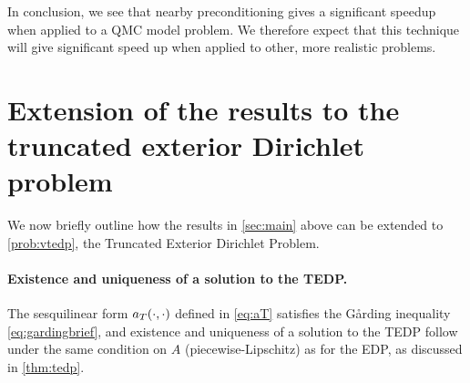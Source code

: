     In conclusion, we see that nearby preconditioning gives a significant speedup when applied to a QMC model problem. We therefore expect that this technique will give significant speed up when applied to other, more realistic problems.
    

    
\section{Extension of the results to the truncated exterior Dirichlet problem}\label{sec:TEDP}

We now briefly outline how the results in \cref{sec:main} above can be extended to \cref{prob:vtedp}, the Truncated Exterior Dirichlet Problem.



\paragraph{Existence and uniqueness of a solution to the TEDP.} The sesquilinear form $a_{T}(\cdot,\cdot)$ defined in \cref{eq:aT} satisfies the G\aa rding inequality \cref{eq:gardingbrief}, and existence and uniqueness of a solution to the TEDP follow under the same condition on $A$ (piecewise-Lipschitz) as for the EDP, as discussed in \cref{thm:tedp}.%

